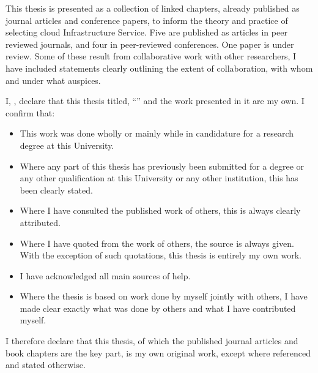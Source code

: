 \begin{declaration}
\addchaptertocentry{\authorshipname} %
This thesis is presented as a collection of linked chapters, already published as journal articles and conference papers, to inform the theory and practice of selecting cloud Infrastructure Service. 
Five are published as articles in peer reviewed journals, and four in peer-reviewed conferences. One paper is under review.
Some of these result from collaborative work with other researchers, I have included statements clearly outlining the extent of collaboration, with whom and under what auspices. 

\noindent I, \authorname, declare that this thesis titled, \enquote{\ttitle} and the work presented in it are my own. I confirm that:

\begin{itemize} 
\item This work was done wholly or mainly while in candidature for a research degree at this University.
\item Where any part of this thesis has previously been submitted for a degree or any other qualification at this University or any other institution, this has been clearly stated.
\item Where I have consulted the published work of others, this is always clearly attributed.
\item Where I have quoted from the work of others, the source is always given. With the exception of such quotations, this thesis is entirely my own work.
\item I have acknowledged all main sources of help.
\item Where the thesis is based on work done by myself jointly with others, I have made clear exactly what was done by others and what I have contributed myself.\\
\end{itemize}

I therefore declare that this thesis, of which the published journal articles and book
chapters are the key part, is my own original work, except where referenced and stated
otherwise.
\end{declaration}

\clearpage